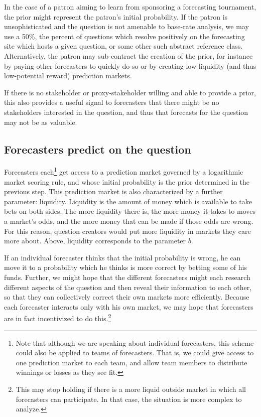 \documentclass[]{article}
\begin{document}
In the case of a patron aiming to learn from sponsoring a forecasting
tournament, the prior might represent the patron's initial probability.
If the patron is unsophisticated and the question is not amenable to
base-rate analysis, we may use a 50\%, the percent of questions which
resolve positively on the forecasting site which hosts a given question,
or some other such abstract reference class. Alternatively, the patron
may sub-contract the creation of the prior, for instance by paying other
forecasters to quickly do so or by creating low-liquidity (and thus
low-potential reward) prediction markets.

If there is no stakeholder or proxy-stakeholder willing and able to
provide a prior, this also provides a useful signal to forecasters that
there might be no stakeholders interested in the question, and thus that
forecasts for the question may not be as valuable.

\hypertarget{forecasters-predict-on-the-question}{%
\subsection{Forecasters predict on the
question}\label{forecasters-predict-on-the-question}}

Forecasters
each\footnote{Note that although we are speaking about individual forecasters, this scheme could also be applied to teams of forecasters. That is, we could give access to one prediction market to each team, and allow team members to distribute winnings or losses as they see fit.}
get access to a prediction market governed by a logarithmic market
scoring rule, and whose initial probability is the prior determined in
the previous step. This prediction market is also characterized by a
further parameter: liquidity. Liquidity is the amount of money which is
available to take bets on both sides. The more liquidity there is, the
more money it takes to moves a market's odds, and the more money that
can be made if those odds are wrong. For this reason, question creators
would put more liquidity in markets they care more about. Above,
liquidity corresponds to the parameter \(b\).

If an individual forecaster thinks that the initial probability is
wrong, he can move it to a probability which he thinks is more correct
by betting some of his funds. Further, we might hope that the different
forecasters might each research different aspects of the question and
then reveal their information to each other, so that they can
collectively correct their own markets more efficiently. Because each
forecaster interacts only with his own market, we may hope that
forecasters are in fact incentivized to do
this.\footnote{This may stop holding if there is a more liquid outside market in which all forecasters can participate. In that case, the situation is more complex to analyze.}
\end{document}
